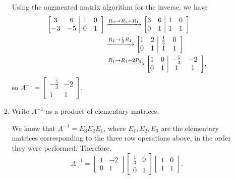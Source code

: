 \documentclass[12pt]{article}
\makeatletter
\newenvironment{aamatrix}[1]{%
  \left[\begin{array}{@{}*{#1}{c}|cc}
}{%
  \end{array}\right]
}
\newcommand{\points}[1]{\marginpar{\hspace{24pt}[#1]}}
\makeatother
\begin{document}
\begin{enumerate}
\begin{enumerate}
\bigskip

 Using the augmented matrix algorithm for the inverse, we have
\begin{align*}
 \begin{aamatrix}{2}
  3&6&1&0\\-3&-5&0&1
 \end{aamatrix} & \xrightarrow[]{R_2\to R_2+R_1}\begin{aamatrix}{2}
                                                3&6&1&0\\0&1&1&1
                                               \end{aamatrix}\\
&\xrightarrow[]{R_1\to\frac{1}{3}R_1}\begin{aamatrix}{2}
                                      1&2&\frac{1}{3}&0\\0&1&1&1
                                     \end{aamatrix}\\
&\xrightarrow[]{R_1\to R_1-2R_2}\begin{aamatrix}{2}
                                 1&0&-\frac{5}{3}&-2\\0&1&1&1
                                \end{aamatrix},
\end{align*}
so $A^{-1} = \begin{bmatrix}-\frac{5}{3}&-2\\1&1\end{bmatrix}$.

\bigskip


\item Write $A^{-1}$ as a product of elementary matrices. \points{3}


\bigskip

 We know that $A^{-1}=E_3E_2E_1$, where $E_1,E_2,E_3$ are the elementary matrices corresponding to the three row operations above, in the order they were performed. Therefore,
\[
 A^{-1}=\begin{bmatrix}1&-2\\0&1\end{bmatrix}\begin{bmatrix}\frac{1}{3}&0\\0&1\end{bmatrix}\begin{bmatrix}1&0\\1&1\end{bmatrix}.
\]


\bigskip



\end{enumerate}
\end{enumerate}
\end{document}
